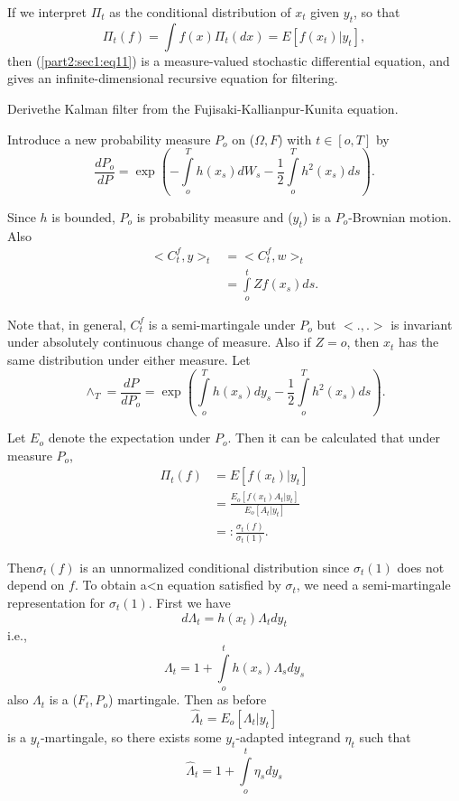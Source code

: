 If we interpret $\Pi _t$ as the conditional distribution of $x_t$
given $y_t$, so that 
$$
\Pi_t (f)= \int f(x)\Pi _t (dx)= E[f(x_t)|y_t],
$$
then (\ref{part2:sec1:eq11}) is a measure-valued stochastic differential equation, and
gives an infinite-dimensional recursive equation for filtering. 


\begin{exercise} %
  Derive\pageoriginale the Kalman filter from the
  Fujisaki-Kallianpur-Kunita equation. 
\end{exercise}

\medskip
{}

Introduce a new probability measure $P_o$ on ($\Omega,F$) with $t \in
[o,T]$ by 
$$
\frac {dP_o}{dP}=\exp \left(- \int \limits^T_o h(x_s)dW_s
-\frac{1}{2}\int \limits^T_o h^2(x_s)ds\right). 
$$

Since $h$ is bounded, $P_o$ is probability measure and ($y_t$) is a
$P_o$-Brownian motion. Also 
\begin{align*}
< C^f_t, y >_t & = <C^f_t, w >_t\\
& = \int \limits ^t_o Zf(x_s)ds.
\end{align*}

Note that, in general, $C^f_t$ is a semi-martingale under $P_o$ but
$<.,.>$ is invariant under absolutely continuous change of
measure. Also if $Z=o$, then $x_t$ has the same distribution under
either measure. Let 
$$
\wedge_T=\frac{dP}{dP_o}= \exp \left(\int \limits ^T_o
h(x_s)dy_s-\frac{1}{2}\int \limits^T_o h^2 (x_s)ds \right). 
$$

Let $E_o$ denote the expectation under $P_o$. Then it can be calculated
that under measure $P_o$, 
\begin{align*}
  \Pi _t (f) & = E[f(x_t) | y_t]\\
  & = \frac{E_o [f(x_t)A_t|y_t]}{E_o [A_t | y_t]}\\
  &= : \frac{\sigma_t (f) }{\sigma_t(1)}.
\end{align*}

Then\pageoriginale $\sigma_t(f)$ is an unnormalized conditional
distribution since 
$\sigma_t(1)$ does not depend on $f$. To obtain a<n equation satisfied
by $\sigma_t$, we need a semi-martingale representation for
$\sigma_t(1)$. First we have  
\begin{equation*}
  d \Lambda_t  =  h(x_t) \Lambda _t dy_t \tag{12}\label{part2:sec1:eq12}
\end{equation*}
i.e.,
$$
\Lambda_t = 1+ \int \limits ^t_o h(x_s) \Lambda_s
  dy_s 
$$
also $\Lambda_t$ is a ($F_t, P_o$) martingale. Then as before 
$$
\hat{\Lambda}_t=E_o [\Lambda_t| y_t]
$$
is a $y_t$-martingale, so there exists some $y_t$-adapted integrand
$\eta _t$ such that 
\begin{equation*}
  \hat{\Lambda}_t=1+ \int \limits^t_o \eta _s dy_s \tag{13}\label{part2:sec1:eq13}
\end{equation*}

